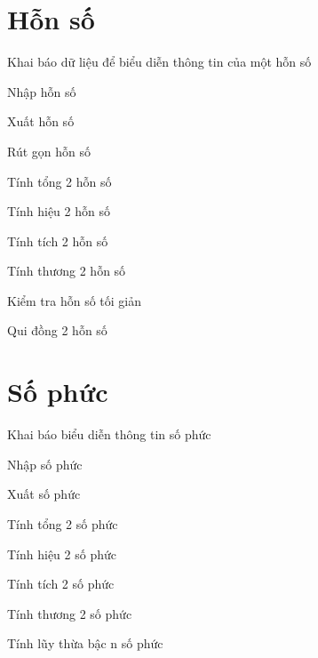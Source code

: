\section{Hỗn số}

\begin{problem}
    Khai báo dữ liệu để biểu diễn thông tin của một hỗn số
\end{problem}
\begin{problem}
    Nhập hỗn số
\end{problem}
\begin{problem}
    Xuất hỗn số
\end{problem}
\begin{problem}
    Rút gọn hỗn số
\end{problem}
\begin{problem}
    Tính tổng 2 hỗn số
\end{problem}
\begin{problem}
    Tính hiệu 2 hỗn số
\end{problem}
\begin{problem}
    Tính tích 2 hỗn số
\end{problem}
\begin{problem}
    Tính thương 2 hỗn số
\end{problem}
\begin{problem}
    Kiểm tra hỗn số tối giản
\end{problem}
\begin{problem}
    Qui đồng 2 hỗn số
\end{problem}


\section{Số phức}

\begin{problem}
    Khai báo biểu diễn thông tin số phức
\end{problem}
\begin{problem}
    Nhập số phức
\end{problem}
\begin{problem}
    Xuất số phức
\end{problem}
\begin{problem}
    Tính tổng 2 số phức
\end{problem}
\begin{problem}
    Tính hiệu 2 số phức
\end{problem}
\begin{problem}
    Tính tích 2 số phức
\end{problem}
\begin{problem}
    Tính thương 2 số phức
\end{problem}
\begin{problem}
    Tính lũy thừa bậc n số phức
\end{problem}

